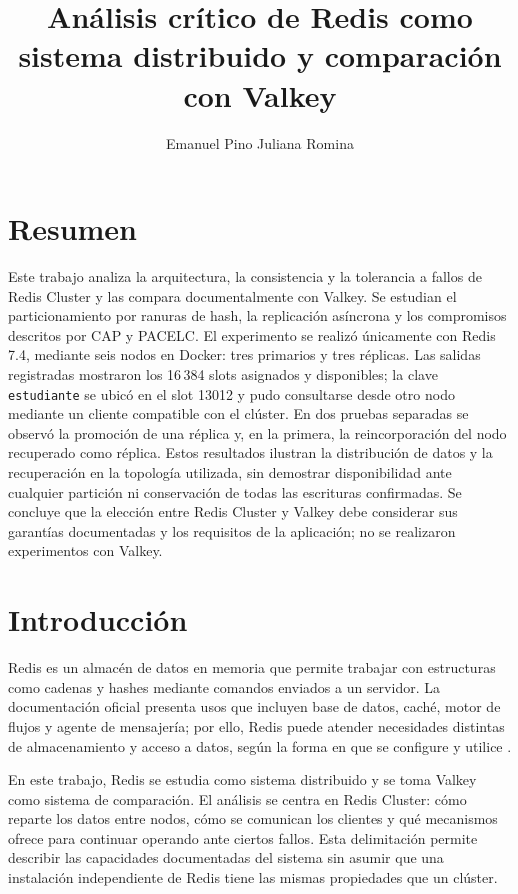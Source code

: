 \documentclass[12pt,a4paper]{article}
\title{Análisis crítico de Redis como sistema distribuido y comparación con Valkey}
\author{Emanuel Pino Juliana Romina}
\date{}
\begin{document}
\maketitle

\section{Resumen}

Este trabajo analiza la arquitectura, la consistencia y la tolerancia a fallos de Redis Cluster y las compara documentalmente con Valkey. Se estudian el particionamiento por ranuras de hash, la replicación asíncrona y los compromisos descritos por CAP y PACELC. El experimento se realizó únicamente con Redis 7.4, mediante seis nodos en Docker: tres primarios y tres réplicas. Las salidas registradas mostraron los 16\,384 slots asignados y disponibles; la clave \texttt{estudiante} se ubicó en el slot 13012 y pudo consultarse desde otro nodo mediante un cliente compatible con el clúster. En dos pruebas separadas se observó la promoción de una réplica y, en la primera, la reincorporación del nodo recuperado como réplica. Estos resultados ilustran la distribución de datos y la recuperación en la topología utilizada, sin demostrar disponibilidad ante cualquier partición ni conservación de todas las escrituras confirmadas. Se concluye que la elección entre Redis Cluster y Valkey debe considerar sus garantías documentadas y los requisitos de la aplicación; no se realizaron experimentos con Valkey.

\section{Introducción}

Redis es un almacén de datos en memoria que permite trabajar con estructuras como cadenas y hashes mediante comandos enviados a un servidor. La documentación oficial presenta usos que incluyen base de datos, caché, motor de flujos y agente de mensajería; por ello, Redis puede atender necesidades distintas de almacenamiento y acceso a datos, según la forma en que se configure y utilice \cite{redisDataStore,redisQuickStarts}.

En este trabajo, Redis se estudia como sistema distribuido y se toma Valkey como sistema de comparación. El análisis se centra en Redis Cluster: cómo reparte los datos entre nodos, cómo se comunican los clientes y qué mecanismos ofrece para continuar operando ante ciertos fallos. Esta delimitación permite describir las capacidades documentadas del sistema sin asumir que una instalación independiente de Redis tiene las mismas propiedades que un clúster.
\end{document}
